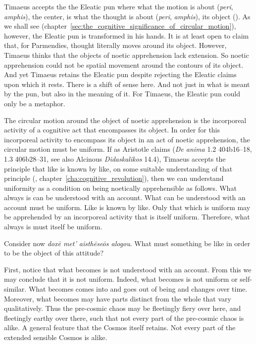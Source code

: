 Timaeus accepts the the Eleatic pun where what the motion is about (\emph{peri}, \emph{amphis}), the center, is what the thought is about (\emph{peri}, \emph{amphis}), its object (\citealt[191--3]{Mourelatos:2008ve}). As we shall see (chapter~\ref{sec:the_cognitive_significance_of_circular_motion}), however, the Eleatic pun is transformed in his hands. It is at least open to claim that, for Parmendies, thought literally moves around its object. However, Timaeus thinks that the objects of noetic apprehension lack extension. So noetic apprehension could not be spatial movement around the contours of its object. And yet Timaeus retains the Eleatic pun despite rejecting the Eleatic claims upon which it rests. There is a shift of sense here. And not just in what is meant by the pun, but also in the meaning of it. For Timaeus, the Eleatic pun could only be a metaphor.

The circular motion around the object of noetic apprehension is the incorporeal activity of a cognitive act that encompasses its object. In order for this incorporeal activity to encompass its object in an act of noetic apprehension, the circular motion must be uniform. If as Aristotle claims (\emph{De anima} 1.2 404b16--18, 1.3 406b28--31, see also Alcinous \emph{Didaskalikos} 14.4), Timaeus accepts the principle that like is known by like, on some suitable understanding of that principle (\citealt{Corcilius:2018bd}, chapter~\ref{cha:cognitive_revolution}), then we can understand uniformity as a condition on being noetically apprehensible as follows. What always is can be understood with an account. What can be understood with an account must be uniform. Like is known by like. Only that which is uniform may be apprehended by an incorporeal activity that is itself uniform. Therefore, what always is must itself be uniform.

Consider now \emph{doxē met’ aisthēseōs alogou}. What must something be like in order to be the object of this attitude?

First, notice that what becomes is not understood with an account. From this we may conclude that it is not uniform. Indeed, what becomes is not uniform or self-similar. What becomes comes into and goes out of being and changes over time. Moreover, what becomes may have parts distinct from the whole that vary qualitatively. Thus the pre-cosmic chaos may be fleetingly fiery over here, and fleetingly earthy over there, such that not every part of the pre-cosmic chaos is alike. A general feature that the Cosmos itself retains. Not every part of the extended sensible Cosmos is alike.

